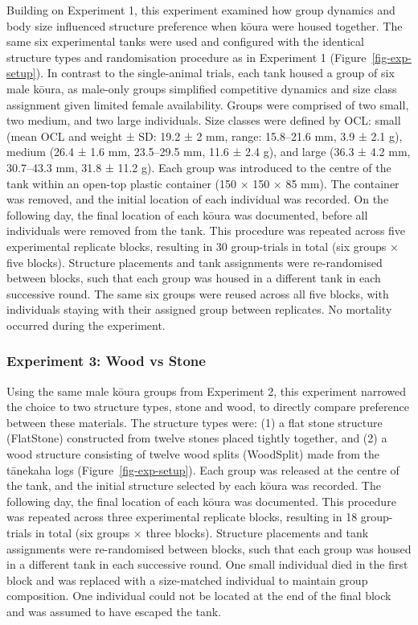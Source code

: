 \documentclass[
  letterpaper,
  DIV=11,
  numbers=noendperiod]{scrartcl}
\begin{document}
Building on Experiment 1, this experiment examined how group dynamics
and body size influenced structure preference when kōura were housed
together. The same six experimental tanks were used and configured with
the identical structure types and randomisation procedure as in
Experiment 1 (Figure~\ref{fig-exp-setup}). In contrast to the
single-animal trials, each tank housed a group of six male kōura, as
male-only groups simplified competitive dynamics and size class
assignment given limited female availability. Groups were comprised of
two small, two medium, and two large individuals. Size classes were
defined by OCL: small (mean OCL and weight ± SD: 19.2 ± 2 mm, range:
15.8--21.6 mm, 3.9 ± 2.1 g), medium (26.4 ± 1.6 mm, 23.5--29.5 mm, 11.6
± 2.4 g), and large (36.3 ± 4.2 mm, 30.7--43.3 mm, 31.8 ± 11.2 g). Each
group was introduced to the centre of the tank within an open-top
plastic container (150 × 150 × 85 mm). The container was removed, and
the initial location of each individual was recorded. On the following
day, the final location of each kōura was documented, before all
individuals were removed from the tank. This procedure was repeated
across five experimental replicate blocks, resulting in 30 group-trials
in total (six groups × five blocks). Structure placements and tank
assignments were re-randomised between blocks, such that each group was
housed in a different tank in each successive round. The same six groups
were reused across all five blocks, with individuals staying with their
assigned group between replicates. No mortality occurred during the
experiment.

\subsubsection{Experiment 3: Wood vs
Stone}\label{experiment-3-wood-vs-stone}

Using the same male kōura groups from Experiment 2, this experiment
narrowed the choice to two structure types, stone and wood, to directly
compare preference between these materials. The structure types were:
(1) a flat stone structure (FlatStone) constructed from twelve stones
placed tightly together, and (2) a wood structure consisting of twelve
wood splits (WoodSplit) made from the tānekaha logs
(Figure~\ref{fig-exp-setup}). Each group was released at the centre of
the tank, and the initial structure selected by each kōura was recorded.
The following day, the final location of each kōura was documented. This
procedure was repeated across three experimental replicate blocks,
resulting in 18 group-trials in total (six groups × three blocks).
Structure placements and tank assignments were re-randomised between
blocks, such that each group was housed in a different tank in each
successive round. One small individual died in the first block and was
replaced with a size-matched individual to maintain group composition.
One individual could not be located at the end of the final block and
was assumed to have escaped the tank.
\end{document}
